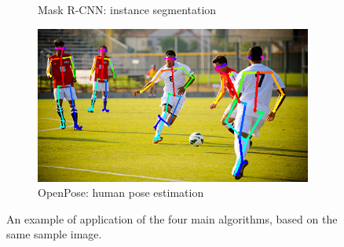 \begin{figure}[!h]
\begin{subfigure}{.48\linewidth}
		\caption{Mask R-CNN: instance segmentation}
	\end{subfigure}
	\hspace{0.01\linewidth}
	\begin{subfigure}{.48\linewidth}
		\includegraphics[width=\linewidth]{images/detection/ex3_openpose}
		\caption{OpenPose: human pose estimation}
	\end{subfigure}
	\captionsetup{margin=0.5cm}
	\caption[YOLO, SSD, Mask R-CNN and OpenPose applied on the same image.]{An example of application of the four main algorithms, based on the same sample image.}
	\label{fig:ex_detectionAlgorithms}
\end{figure}









